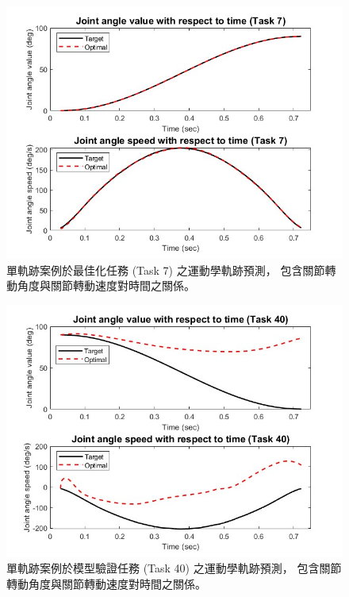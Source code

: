 \begin{figure}[!ht]
	\centering
	\includegraphics[width=13cm]{figure/ch5_fig_CaseE_BICs_Opt_7.JPG}
    \caption[單軌跡案例於最佳化任務之運動軌跡預測]{單軌跡案例於最佳化任務 (Task 7) 之運動學軌跡預測，
                                              包含關節轉動角度與關節轉動速度對時間之關係。}
    \label{ch5_fig_CaseE_BICs_7}
\end{figure}

\clearpage

\begin{figure}[!ht]
	\centering
    \includegraphics[width=13cm]{figure/ch5_fig_CaseE_BICs_Vali_40.JPG}
    \caption[單軌跡案例於模型驗證任務之運動軌跡預測]{單軌跡案例於模型驗證任務 (Task 40) 之運動學軌跡預測，
                                                包含關節轉動角度與關節轉動速度對時間之關係。}
    \label{ch5_fig_CaseE_BICs_40}
\end{figure}

